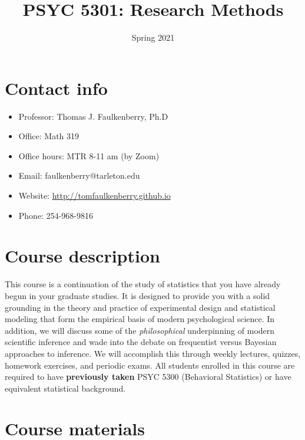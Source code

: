 \documentclass[10pt]{article}
\date{Spring 2021}
\title{PSYC 5301: Research Methods}
\begin{document}
\maketitle

\section*{Contact info}
\label{sec:orgc39eee2}
\begin{itemize}
\item Professor: Thomas J. Faulkenberry, Ph.D
\item Office: Math 319
\item Office hours: MTR 8-11 am (by Zoom)
\item Email: faulkenberry@tarleton.edu
\item Website: \url{http://tomfaulkenberry.github.io}
\item Phone: 254-968-9816
\end{itemize}

\section*{Course description}
\label{sec:org2062b98}

This course is a continuation of the study of statistics that you have already begun in your graduate studies. It is designed to provide you with a solid grounding in the theory and practice of experimental design and statistical modeling that form the empirical basis of modern psychological science. In addition, we will discuss some of the \emph{philosophical} underpinning of modern scientific inference and wade into the debate on frequentist versus Bayesian approaches to inference.  We will accomplish this through weekly lectures, quizzes, homework exercises, and periodic exams. All students enrolled in this course are required to have \textbf{previously taken} PSYC 5300 (Behavioral Statistics) or have equivalent statistical background.

\section*{Course materials}
\label{sec:org9ea6133}
\end{document}
